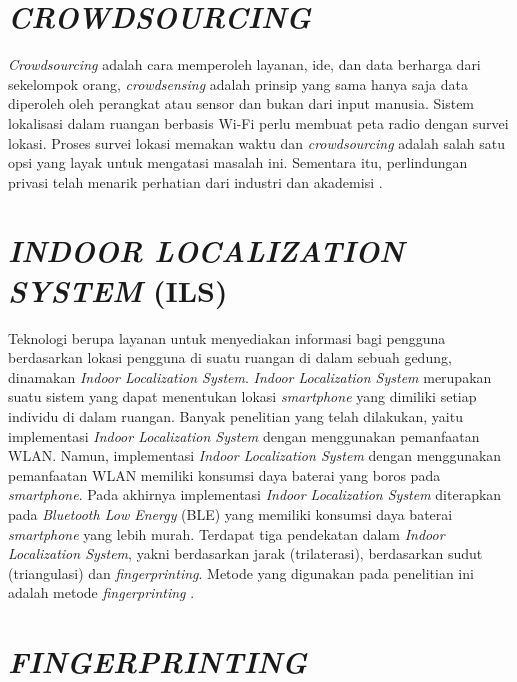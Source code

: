 \section{\uppercase{\textit{CROWDSOURCING}}}
\textit{Crowdsourcing} adalah cara memperoleh layanan, ide, dan data berharga dari sekelompok orang, \textit{crowdsensing} adalah prinsip yang sama hanya saja data diperoleh oleh perangkat atau sensor dan bukan dari input manusia. Sistem lokalisasi dalam ruangan berbasis Wi-Fi perlu membuat peta radio dengan survei lokasi. Proses survei lokasi memakan waktu dan \textit{crowdsourcing} adalah salah satu opsi yang layak untuk mengatasi masalah ini. Sementara itu, perlindungan privasi telah menarik perhatian dari industri dan akademisi \citep{Li2018}.

\section{\uppercase{\textit{INDOOR LOCALIZATION SYSTEM} (ILS)}}
Teknologi berupa layanan untuk menyediakan informasi bagi pengguna berdasarkan lokasi pengguna di suatu ruangan di dalam sebuah gedung, dinamakan \textit{Indoor Localization System}. \textit{Indoor Localization System} merupakan suatu sistem yang dapat menentukan lokasi \textit{smartphone} yang dimiliki setiap individu di dalam ruangan. Banyak penelitian yang telah dilakukan, yaitu implementasi \textit{Indoor Localization System} dengan menggunakan pemanfaatan WLAN. Namun, implementasi \textit{Indoor Localization System} dengan menggunakan pemanfaatan WLAN memiliki konsumsi daya baterai yang boros pada \textit{smartphone}. Pada akhirnya implementasi \textit{Indoor Localization System} diterapkan pada \textit{Bluetooth Low Energy }(BLE) yang memiliki konsumsi daya baterai \textit{smartphone} yang lebih murah. Terdapat tiga pendekatan dalam \textit{Indoor Localization System}, yakni berdasarkan jarak (trilaterasi), berdasarkan sudut (triangulasi) dan \textit{fingerprinting}. Metode yang digunakan pada penelitian ini adalah metode \textit{fingerprinting} \citep{Santos2021}.




\section{\uppercase{\textit{FINGERPRINTING}}}

